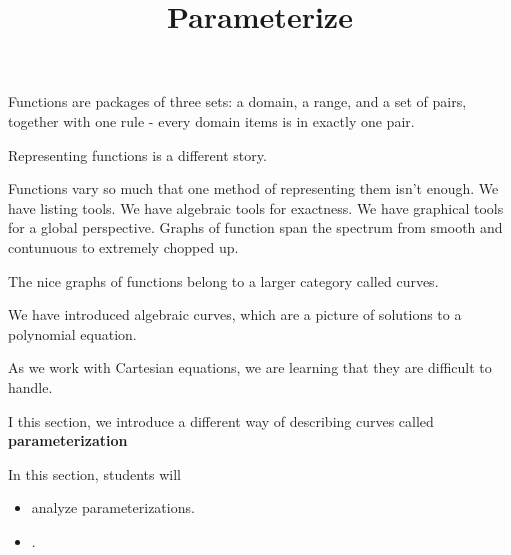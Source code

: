\documentclass{ximera}
\title{Parameterize}
\begin{document}
\begin{abstract}
\end{abstract}
\maketitle





Functions are packages of three sets: a domain, a range, and a set of pairs, together with one rule - every domain items is in exactly one pair.

Representing functions is a different story.

Functions vary so much that one method of representing them isn't enough.  We have listing tools.  We have algebraic tools for exactness.  We have graphical tools for a global perspective. Graphs of function span the spectrum from smooth and contunuous to extremely chopped up.

The nice graphs of functions belong to a larger category called curves.

We have introduced algebraic curves, which are a picture of solutions to a polynomial equation.

As we work with Cartesian equations, we are learning that they are difficult to handle.

I this section, we introduce a different way of describing curves called \textbf{parameterization}























\begin{sectionOutcomes}
In this section, students will 

\begin{itemize}
\item analyze parameterizations.
\item .
\end{itemize}
\end{sectionOutcomes}
\end{document}

